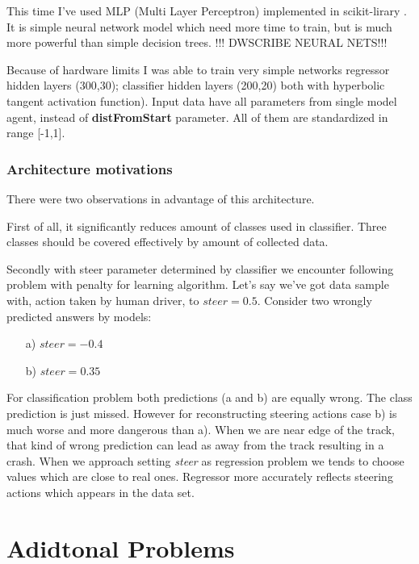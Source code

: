 \documentclass[declaration,shortabstract,english,inz]{iithesis}
\begin{document}
This time I've used MLP (Multi Layer Perceptron) implemented in scikit-lirary \cite{scikit_learn}. It is simple neural network model which need more time to train, but is much more powerful than simple decision trees. 
!!! DWSCRIBE NEURAL NETS!!!

Because of hardware limits I was able to train very simple networks regressor hidden layers (300,30); classifier hidden layers (200,20) both with hyperbolic tangent activation function). Input data have all parameters from single model agent, instead of \textbf{distFromStart} parameter. All of them are standardized in range [-1,1].

\subsection{Architecture motivations}

There were two observations in advantage of this architecture. 

First of all, it significantly reduces amount of classes used in classifier. Three classes should be covered effectively by amount of collected data.

Secondly with steer parameter determined by classifier we encounter following problem with penalty for learning algorithm. Let's say we've got data sample with, action taken by human driver, to $steer=0.5$. Consider two wrongly predicted answers by models:
\begin{itemize}
    \item[a)] $steer=-0.4$
    \item[b)] $steer=0.35$
\end{itemize}

For classification problem both predictions (a and b) are equally wrong.  The class prediction is just missed. However for reconstructing steering actions case b) is much worse and more dangerous than a). When we are near edge of the track, that kind of wrong prediction can lead as away from the track resulting in a crash. When we approach setting \textit{steer} as regression problem we tends to choose values which are close to real ones. Regressor more accurately reflects steering actions which appears in the data set.







\chapter{Adidtonal Problems}
\end{document}
